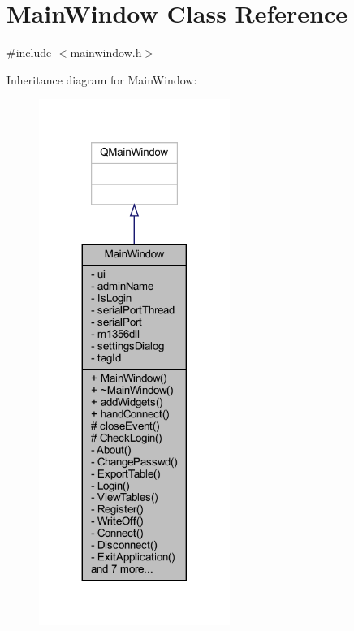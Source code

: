 \hypertarget{class_main_window}{}\section{Main\+Window Class Reference}
\label{class_main_window}


{\ttfamily \#include $<$mainwindow.\+h$>$}



Inheritance diagram for Main\+Window\+:
\nopagebreak
\begin{figure}[H]
\begin{center}
\leavevmode
\includegraphics[width=176pt]{class_main_window__inherit__graph}
\end{center}
\end{figure}



